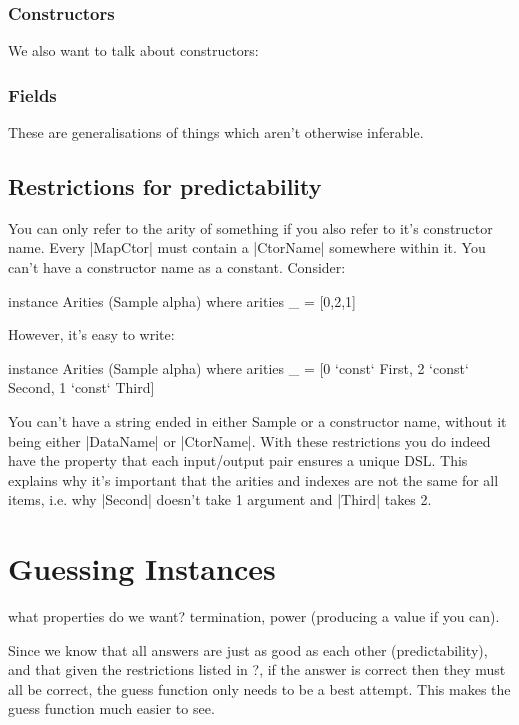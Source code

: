 \documentclass[preprint]{sigplanconf}
\begin{document}
\subsubsection{Constructors}

We also want to talk about constructors:

\subsubsection{Fields}

These are generalisations of things which aren't otherwise inferable.



\subsection{Restrictions for predictability}
\label{sec:predictability}

You can only refer to the arity of something if you also refer to it's constructor name. Every |MapCtor| must contain a |CtorName| somewhere within it. You can't have a constructor name as a constant. Consider:

\begin{code}
instance Arities (Sample alpha) where
    arities _ = [0,2,1]
\end{code}

However, it's easy to write:

\begin{code}
instance Arities (Sample alpha) where
    arities _ = [0 `const` First{}, 2 `const` Second{}, 1 `const` Third{}]
\end{code}

You can't have a string ended in either Sample or a constructor name, without it being either |DataName| or |CtorName|.
With these restrictions you do indeed have the property that each input/output pair ensures a unique DSL. This explains why it's important that the arities and indexes are not the same for all items, i.e. why |Second| doesn't take 1 argument and |Third| takes 2.

\section{Guessing Instances}
\label{sec:guess}

what properties do we want? termination, power (producing a value if you can).

Since we know that all answers are just as good as each other (predictability), and that given the restrictions listed in ?, if the answer is correct then they must all be correct, the guess function only needs to be a best attempt. This makes the guess function much easier to see.
\end{document}

